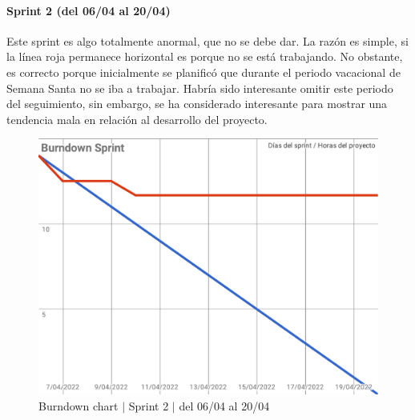 \paragraph{Sprint 2 (del 06/04 al 20/04)}
Este sprint es algo totalmente anormal, que no se debe dar. La razón es simple, si la línea roja permanece horizontal es porque no se está trabajando. No obstante, es correcto porque inicialmente se planificó que durante el periodo vacacional de Semana Santa no se iba a trabajar. Habría sido interesante omitir este periodo del seguimiento, sin embargo, se ha considerado interesante para mostrar una tendencia mala en relación al desarrollo del proyecto.
\begin{figure}[H]
    \centering
    \includegraphics[width=1\linewidth]{text/image/BurndownChart2.pdf}
    \caption{Burndown chart $|$ Sprint 2 $|$ del 06/04 al 20/04}
    \label{fig:burndown_chart_2}
\end{figure}

\newpage
